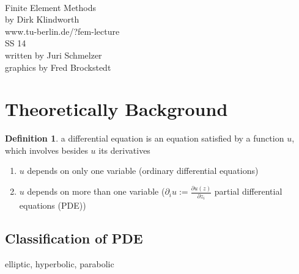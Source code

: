 \documentclass[english]{article}
\theoremstyle{definition}
\newtheorem*{defi}{Definition}
\theoremstyle{remark}
\newcommand{\f}[2]{\frac{#1}{#2}}							%
\newcommand{\p}{\partial}
\begin{document}
\begin{titlepage}
  \begin{center}
    \ \\
    \vspace{03mm}
    {\huge Finite Element Methods\\}
    \vspace{12mm}
    {\Large by Dirk Klindworth}\\
    www.tu-berlin.de/?fem-lecture
    \vspace{12mm}\\
    {\Large  {SS 14\\ }}
    \vspace{15mm}
    {\Large written by Juri Schmelzer  \\
      graphics by Fred Brockstedt}
  \end{center}
\end{titlepage}
\newpage
\tableofcontents
\newpage
\section{Theoretically Background}
\begin{defi} a differential equation is an equation satisfied by a function $u$, which involves besides $u$ its derivatives
  \begin{enumerate}
  \item $u$ depends on only one variable (ordinary differential equations)
  \item $u$ depends on more than one variable ($\p_i u:= \f{\p u (z)}{\p z_i}$ partial differential equations (PDE))
  \end{enumerate}
\end{defi}
\subsection{Classification of PDE}
elliptic, hyperbolic, parabolic
\end{document}
